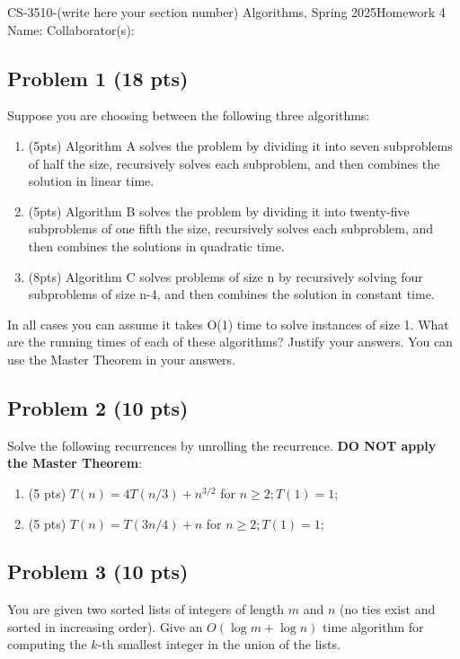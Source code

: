 \documentclass[12pt]{article}
\begin{document}
\noindent CS-3510-(write here your section number) Algorithms, Spring 2025\hfill Homework 4\\
Name: \hfill Collaborator(s):

\hrulefill

\subsection*{Problem 1 (18 pts)}
Suppose you are choosing between the following three algorithms:
\begin{enumerate}[label=(\alph*)]
    \item (5pts) Algorithm A solves the problem by dividing it into seven subproblems of half the size, recursively solves each subproblem, and then combines the solution in linear time. 
    \item (5pts) Algorithm B solves the problem by dividing it into twenty-five subproblems of one fifth the size, recursively solves each subproblem, and then combines the solutions in quadratic time.
    \item (8pts) Algorithm C solves problems of size n by recursively solving four subproblems of size n-4, and then combines the solution in constant time.
\end{enumerate}
In all cases you can assume it takes O(1) time to solve instances of size 1. What are the running times of each of these algorithms? Justify your answers. You can use the Master Theorem in your answers.

\subsection*{Problem 2 (10 pts)}
Solve the following recurrences by unrolling the recurrence. \textbf{DO NOT apply the Master Theorem}:
\begin{enumerate}[label=(\alph*)]
    \item (5 pts) $T(n) = 4T(n/3) + n^{3/2}$ for $n\ge2; T(1)=1;$
    \item (5 pts) $T(n) = T(3n/4) + n$ for $n \ge 2; T(1)=1;$
\end{enumerate}

\subsection*{Problem 3 (10 pts)}
You are given two sorted lists of integers of length $m$ and $n$ (no ties exist and sorted in increasing order). Give an $O(\log m + \log n)$ time algorithm for computing the $k$-th smallest integer in the union of the lists.\\
\end{document}
